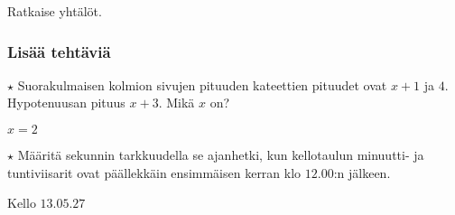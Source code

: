 \begin{tehtavasivu}
\begin{tehtava}
    Ratkaise yhtälöt.
    \begin{alakohdat}
    \end{alakohdat}
    \begin{vastaus}
        \begin{alakohdat}
        \end{alakohdat}
    \end{vastaus}
\end{tehtava}

\subsubsection*{Lisää tehtäviä}

\begin{tehtava}
   $\star$ Suorakulmaisen kolmion sivujen pituuden kateettien pituudet ovat $x+1$ ja $4$. Hypotenuusan pituus $x+3$. Mikä $x$ on?
    \begin{vastaus}
		$x=2$
    \end{vastaus}
\end{tehtava}

\begin{tehtava}
    $\star$ Määritä sekunnin tarkkuudella se ajanhetki, kun kellotaulun minuutti- ja tuntiviisarit ovat päällekkäin ensimmäisen kerran klo $12.00$:n jälkeen.
    \begin{vastaus}
		Kello $13.05.27$
    \end{vastaus}
\end{tehtava}

\end{tehtavasivu}